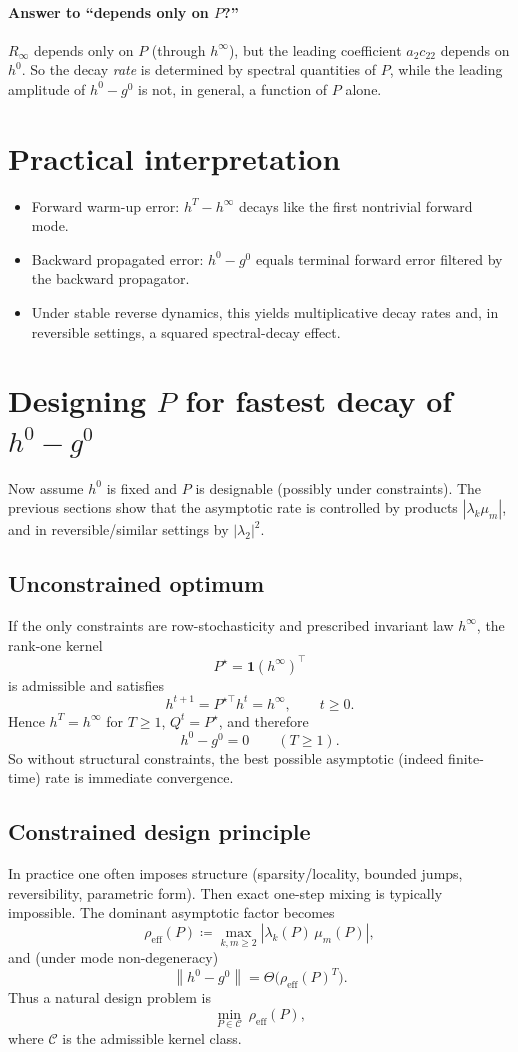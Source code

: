 \documentclass[11pt]{article}
\newcommand{\ones}{\mathbf{1}}
\newcommand{\norm}[1]{\left\lVert #1\right\rVert}
\begin{document}
\paragraph{Answer to ``depends only on $P$?''}
$R_\infty$ depends only on $P$ (through $h^\infty$), but the leading coefficient $a_2c_{22}$ depends on $h^0$.
So the decay \emph{rate} is determined by spectral quantities of $P$, while the leading amplitude of $h^0-g^0$ is not, in general, a function of $P$ alone.

\section{Practical interpretation}
\begin{itemize}
\item Forward warm-up error: $h^T-h^\infty$ decays like the first nontrivial forward mode.
\item Backward propagated error: $h^0-g^0$ equals terminal forward error filtered by the backward propagator.
\item Under stable reverse dynamics, this yields multiplicative decay rates and, in reversible settings, a squared spectral-decay effect.
\end{itemize}

\section{Designing $P$ for fastest decay of $h^0-g^0$}
Now assume $h^0$ is fixed and $P$ is designable (possibly under constraints). The previous sections show that the asymptotic rate is controlled by products $|\lambda_k\mu_m|$, and in reversible/similar settings by $|\lambda_2|^2$.

\subsection*{Unconstrained optimum}
If the only constraints are row-stochasticity and prescribed invariant law $h^\infty$,
the rank-one kernel
\[
P^\star=\ones (h^\infty)^\top
\]
is admissible and satisfies
\[
h^{t+1}=P^{\star\top}h^t=h^\infty,\qquad t\ge 0.
\]
Hence $h^T=h^\infty$ for $T\ge 1$, $Q^t=P^\star$, and therefore
\[
h^0-g^0=0\qquad (T\ge 1).
\]
So without structural constraints, the best possible asymptotic (indeed finite-time) rate is immediate convergence.

\subsection*{Constrained design principle}
In practice one often imposes structure (sparsity/locality, bounded jumps, reversibility, parametric form). Then exact one-step mixing is typically impossible.
The dominant asymptotic factor becomes
\[
\rho_{\mathrm{eff}}(P)\coloneqq \max_{k,m\ge 2} |\lambda_k(P)\,\mu_m(P)|,
\]
and (under mode non-degeneracy) 
\[
\norm{h^0-g^0}=\Theta\!\big(\rho_{\mathrm{eff}}(P)^T\big).
\]
Thus a natural design problem is
\[
\min_{P\in\mathcal C}\ \rho_{\mathrm{eff}}(P),
\]
where $\mathcal C$ is the admissible kernel class.
\end{document}
